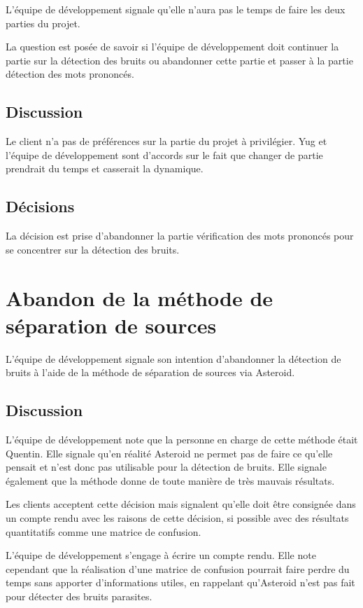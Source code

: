 \documentclass{article}
\begin{document}
L'équipe de développement signale qu'elle n'aura pas le temps de faire les deux parties du projet.

La question est posée de savoir si l'équipe de développement doit continuer la partie sur la détection des bruits ou abandonner cette partie et passer à la partie détection des mots prononcés.

\subsection{Discussion}

Le client n'a pas de préférences sur la partie du projet à privilégier. Yug et l'équipe de développement sont d'accords sur le fait que changer de partie prendrait du temps et casserait la dynamique.

\subsection{Décisions}

La décision est prise d'abandonner la partie vérification des mots prononcés pour se concentrer sur la détection des bruits.


\section{Abandon de la méthode de séparation de sources}

L'équipe de développement signale son intention d'abandonner la détection de bruits à l'aide de la méthode de séparation de sources via Asteroid.

\subsection{Discussion}

L'équipe de développement note que la personne en charge de cette méthode était Quentin. Elle signale qu'en réalité Asteroid ne permet pas de faire ce qu'elle pensait et n'est donc pas utilisable pour la détection de bruits. Elle signale également que la méthode donne de toute manière de très mauvais résultats.

Les clients acceptent cette décision mais signalent qu'elle doit être consignée dans un compte rendu avec les raisons de cette décision, si possible avec des résultats quantitatifs comme une matrice de confusion.

L'équipe de développement s'engage à écrire un compte rendu. Elle note cependant que la réalisation d'une matrice de confusion pourrait faire perdre du temps sans apporter d'informations utiles, en rappelant qu'Asteroid n'est pas fait pour détecter des bruits parasites.
\end{document}
